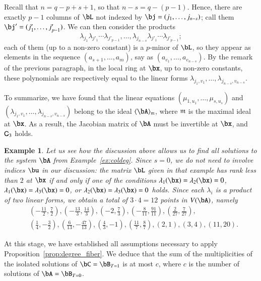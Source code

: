 \documentclass[amsthm]{elsart}
\newtheorem{example}[definition]{Example}
\begin{document}
Recall that $n=q-p+s+1$, so that $n-s = q-(p-1)$. Hence, there are
exactly $p-1$ columns of $\bL$ not indexed by $\bj=(j_1,\dots,j_{n-s})$; call
them $\bj'=(j'_1,\dots,j'_{p-1})$. We can then consider the 
products
$$ \lambda_{j_1} \lambda_{j'_1} \cdots \lambda_{j'_{p-1}},\dots, \lambda_{j_{n-s}}
\lambda_{j'_1} \cdots \lambda_{j'_{p-1}};$$ each of them (up to a non-zero
constant) is a $p$-minor of $\bL$, so they appear as elements in the
sequence $(a_{s+1},\dots,a_m)$, say as
$(a_{e_1},\dots,a_{e_{n-s}})$. By the remark of the previous
paragraph, in the local ring at $\bx$, up to non-zero constants, these
polynomials are respectively equal to the linear forms
$\lambda_{j_1,v_1},\dots,\lambda_{j_{n-s},v_{n-s}}$.  

To summarize, we have found that the linear equations
$(\mu_{1,u_1},\dots,\mu_{s,u_s})$ and
$(\lambda_{j_1,v_1},\dots,\lambda_{j_{n-s},v_{n-s}})$ belong to the
ideal $\langle \bA \rangle_\m$, where $\mathfrak{m}$ is the maximal ideal at
$\bx$. As a result, the Jacobian matrix of $\bA$ must be invertible
at $\bx$, and $\mathsf{C}_3$ holds.

\begin{example}\label{ex:12pts}
  Let us see how the discussion above allows us to find all solutions
  to the system $\bA$ from Example~\ref{ex:coldeg}. Since $s=0$, we do
  not need to involve indices $\bu$ in our discussion: the matrix
  $\bL$ given in that example has rank less than $2$ at $\bx$ if and
  only if one of the conditions $\lambda_1(\bx)=\lambda_2(\bx)=0$,
  $\lambda_1(\bx)=\lambda_3(\bx)=0$, or
  $\lambda_2(\bx)=\lambda_3(\bx)=0$ holds. Since each $\lambda_i$
  is a product of two linear forms, we obtain a total of $3 \cdot 4 = 12$ 
  points in $V(\bA)$, namely
  \begin{align*}
&  (-\frac{11}2, \frac 72), (-\frac{13}3, \frac{14}3), (-2, \frac 73), (-\frac 8{11}, \frac{91}{11}), (\frac 2{27}, \frac 7{27}), \\ 
&  (\frac 14, -\frac 32), (\frac 6{13}, -\frac{47}{13}), (\frac 43, -1), (\frac {11}7, \frac 87), (2, 1), (3, 4), (11, 20).
  \end{align*}
\end{example}


\medskip

At this stage, we have established all assumptions necessary to apply
Proposition~\ref{prop:degree_fiber}. We deduce that the sum of the
multiplicities of the isolated solutions of $\bC=\bB_{T=1}$ is at most
$c$, where $c$ is the number of solutions of $\bA=\bB_{T=0}$.
\end{document}
